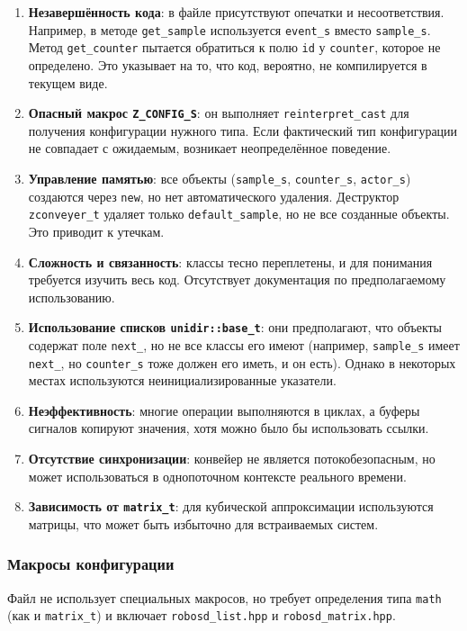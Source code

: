 \documentclass[a4paper,12pt]{article}
\begin{document}
\begin{enumerate}
    \item \textbf{Незавершённость кода}: в файле присутствуют опечатки и несоответствия. Например, в методе \texttt{get\_sample} используется \texttt{event\_s} вместо \texttt{sample\_s}. Метод \texttt{get\_counter} пытается обратиться к полю \texttt{id} у \texttt{counter}, которое не определено. Это указывает на то, что код, вероятно, не компилируется в текущем виде.
    \item \textbf{Опасный макрос \texttt{Z\_CONFIG\_S}}: он выполняет \texttt{reinterpret\_cast} для получения конфигурации нужного типа. Если фактический тип конфигурации не совпадает с ожидаемым, возникает неопределённое поведение.
    \item \textbf{Управление памятью}: все объекты (\texttt{sample\_s}, \texttt{counter\_s}, \texttt{actor\_s}) создаются через \texttt{new}, но нет автоматического удаления. Деструктор \texttt{zconveyer\_t} удаляет только \texttt{default\_sample}, но не все созданные объекты. Это приводит к утечкам.
    \item \textbf{Сложность и связанность}: классы тесно переплетены, и для понимания требуется изучить весь код. Отсутствует документация по предполагаемому использованию.
    \item \textbf{Использование списков \texttt{unidir::base\_t}}: они предполагают, что объекты содержат поле \texttt{next\_}, но не все классы его имеют (например, \texttt{sample\_s} имеет \texttt{next\_}, но \texttt{counter\_s} тоже должен его иметь, и он есть). Однако в некоторых местах используются неинициализированные указатели.
    \item \textbf{Неэффективность}: многие операции выполняются в циклах, а буферы сигналов копируют значения, хотя можно было бы использовать ссылки.
    \item \textbf{Отсутствие синхронизации}: конвейер не является потокобезопасным, но может использоваться в однопоточном контексте реального времени.
    \item \textbf{Зависимость от \texttt{matrix\_t}}: для кубической аппроксимации используются матрицы, что может быть избыточно для встраиваемых систем.
\end{enumerate}

\subsubsection{Макросы конфигурации}

Файл не использует специальных макросов, но требует определения типа \texttt{math} (как и \texttt{matrix\_t}) и включает \texttt{robosd\_list.hpp} и \texttt{robosd\_matrix.hpp}.
\end{document}
